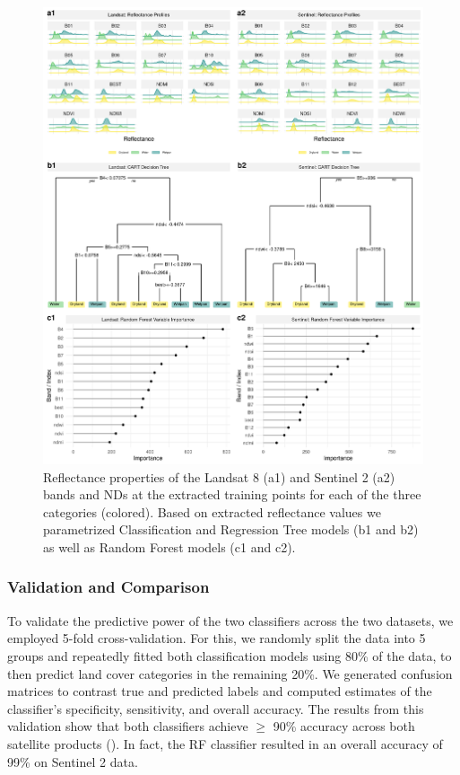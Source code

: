 \documentclass[abstract=on,10pt,a4paper,bibliography=totocnumbered]{article}
\begin{document}
\begin{figure}[htbp]
 \begin{center}
  \includegraphics[width = \textwidth]{Figures/Reflectances.png}
  \caption{Reflectance properties of the Landsat 8 (a1) and Sentinel 2 (a2)
  bands and NDs at the extracted training points for each of the three
  categories (colored). Based on extracted reflectance values we parametrized
  Classification and Regression Tree models (b1 and b2) as well as Random Forest
  models (c1 and c2).}
  \label{Reflectances}
 \end{center}
\end{figure}

\subsubsection{Validation and Comparison}

To validate the predictive power of the two classifiers across the two datasets,
we employed 5-fold cross-validation. For this, we randomly split the data into 5
groups and repeatedly fitted both classification models using 80\% of the data,
to then predict land cover categories in the remaining 20\%. We generated
confusion matrices to contrast true and predicted labels and computed estimates
of the classifier's specificity, sensitivity, and overall accuracy. The results
from this validation show that both classifiers achieve $\geq$ 90\% accuracy
across both satellite products (). In fact, the
RF classifier resulted in an overall accuracy of 99\% on Sentinel 2 data.
\end{document}
